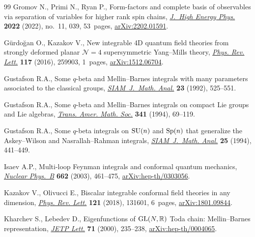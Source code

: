 \documentclass[pdftex]{sigma}
\numberwithin{equation}{section}
\begin{document}
\begin{thebibliography}{99}
Gromov N., Primi N., Ryan P., Form-factors and complete basis of observables
 via separation of variables for higher rank spin chains,
 \href{https://doi.org/10.1007/jhep11(2022)039}{\textit{J.~High Energy Phys.}}
 \textbf{2022} (2022), no.~11, 039, 53~pages,
 \href{http://arxiv.org/abs/2202.01591}{arXiv:2202.01591}.

G\"urdo\u{g}an O., Kazakov V., {N}ew integrable 4{D} quantum field theories
 from strongly deformed planar {$\mathcal{N}=4$} supersymmetric
 {Y}ang--{M}ills theory,
 \href{https://doi.org/10.1103/PhysRevLett.117.259903}{\textit{Phys. Rev.
 Lett.}} \textbf{117} (2016), 259903, 1~pages,
 \href{http://arxiv.org/abs/1512.06704}{arXiv:1512.06704}.

Gustafson R.A., Some {$q$}-beta and {M}ellin--{B}arnes integrals with many
 parameters associated to the classical groups,
 \href{https://doi.org/10.1137/0523026}{\textit{SIAM~J.~Math. Anal.}}
 \textbf{23} (1992), 525--551.

Gustafson R.A., Some {$q$}-beta and {M}ellin--{B}arnes integrals on compact
 {L}ie groups and {L}ie algebras,
 \href{https://doi.org/10.2307/2154615}{\textit{Trans. Amer. Math. Soc.}}
 \textbf{341} (1994), 69--119.

Gustafson R.A., Some {$q$}-beta integrals on {${\rm SU}(n)$} and {${\rm
 Sp}(n)$} that generalize the {A}skey--{W}ilson and {N}asrallah--{R}ahman
 integrals,
 \href{https://doi.org/10.1137/S0036141092248614}{\textit{SIAM~J.~Math.
 Anal.}} \textbf{25} (1994), 441--449.

Isaev A.P., Multi-loop {F}eynman integrals and conformal quantum mechanics,
 \href{https://doi.org/10.1016/S0550-3213(03)00393-6}{\textit{Nuclear
 Phys.~B}} \textbf{662} (2003), 461--475,
 \href{http://arxiv.org/abs/hep-th/0303056}{arXiv:hep-th/0303056}.

Kazakov V., Olivucci E., Biscalar integrable conformal field theories in any
 dimension,
 \href{https://doi.org/10.1103/PhysRevLett.121.131601}{\textit{Phys. Rev.
 Lett.}} \textbf{121} (2018), 131601, 6~pages,
 \href{http://arxiv.org/abs/1801.09844}{arXiv:1801.09844}.

Kharchev S., Lebedev D., Eigenfunctions of ${\rm GL}(N,\mathbb{R})$ {T}oda
 chain: {M}ellin--{B}arnes representation,
 \href{https://doi.org/10.1134/1.568323}{\textit{JETP Lett.}} \textbf{71}
 (2000), 235--238,
 \href{http://arxiv.org/abs/hep-th/0004065}{arXiv:hep-th/0004065}.


\end{thebibliography}
\end{document}

